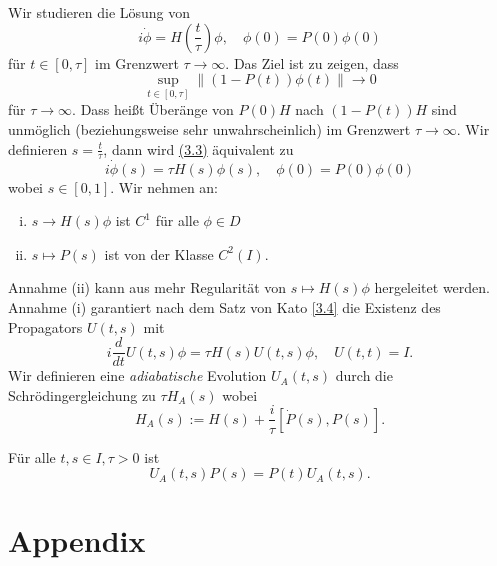 \documentclass{mycourse}
\renewcommand{\eqref}[1]{\hyperref[#1]{(#1)}}
\begin{document}
Wir studieren die Lösung von
\begin{equation}\label{3.3}
i \dot \phi = H(\frac{t}{\tau}) \phi,\quad \phi(0)= P(0) \phi(0)
\end{equation}
für $t\in [0, \tau]$ im Grenzwert $\tau \to \infty$. Das Ziel ist zu zeigen, dass
\[
\sup_{t\in [0, \tau]} \| (1- P(t)) \phi(t) \| \to 0
\]
für $\tau \to \infty$. Dass heißt Überänge von $P(0) H$ nach $(1- P(t))H$ sind unmöglich (beziehungsweise sehr unwahrscheinlich) im Grenzwert $\tau \to \infty$. Wir definieren $s=\frac{t}{\tau}$, dann wird \eqref{3.3} äquivalent zu
\[
i \dot \phi(s) = \tau H(s) \phi(s), \quad \phi(0)= P(0) \phi(0)
\]
wobei $s\in [0,1]$. Wir nehmen an:
\begin{enumerate}[(i)]
\item $s\to H(s) \phi$ ist $C^1$ für alle $\phi\in D$
\item $s\mapsto P(s)$ ist von der Klasse $C^2(I)$.
\end{enumerate}
Annahme (ii) kann aus mehr Regularität von $s\mapsto H(s) \phi$ hergeleitet werden. Annahme (i) garantiert nach dem Satz von Kato \ref{3.4} die Existenz des Propagators $U(t,s)$ mit
\[
i \frac{d}{dt} U(t,s) \phi= \tau H(s) U(t,s) \phi, \quad U(t,t) = I.
\]
Wir definieren eine \emph{adiabatische} Evolution $U_A(t,s)$ durch die Schrödingergleichung zu $\tau H_A(s)$ wobei
\[
H_A(s):= H(s) + \frac{i}{\tau} [\dot P(s), P(s)].
\]
\begin{lem} Für alle $t,s \in I, \tau >0$ ist
\[
U_A(t,s) P(s) = P(t) U_A(t,s).
\]
\end{lem}










\appendix
\chapter{Appendix}
\end{document}
